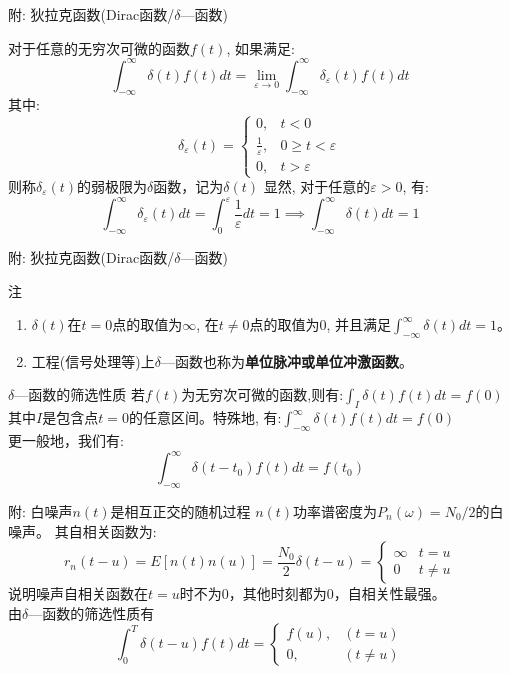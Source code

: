 \begin{frame}{附: 狄拉克函数(Dirac函数/$\delta$---函数)}
\begin{definition}[$\delta$---函数]
	对于任意的无穷次可微的函数$f(t)$, 如果满足:
	$$\int_{-\infty}^{\infty}\delta (t)f(t)dt=\lim\limits_{\varepsilon\to 0}\int_{-\infty}^{\infty}\delta_{\varepsilon}(t)f(t)dt $$
	其中:
	\[
	\delta_{\varepsilon}(t)=\begin{cases}
	0,&t<0\\
	\frac{1}{\varepsilon}, & 0\ge t<\varepsilon\\
	0, &t>\varepsilon
	\end{cases}
	\]
	则称$\delta_\varepsilon(t)$的弱极限为$\delta$函数，记为$\delta(t)$
	显然, 对于任意的$\varepsilon>0$, 有:
	$$\int_{-\infty}^{\infty}\delta_{\varepsilon}(t)dt=\int_{0}^{\varepsilon}\frac{1}{\varepsilon}dt=1\implies \int_{-\infty}^\infty\delta(t)dt=1$$
\end{definition}
\end{frame}

\begin{frame}{附: 狄拉克函数(Dirac函数/$\delta$---函数)}
\begin{block}{注}
\begin{enumerate}
	\item $\delta(t)$在$t=0$点的取值为$\infty$, 在$t\ne 0$点的取值为0, 并且满足$\int_{-\infty}^{\infty}\delta(t)dt=1$。
	\item 工程(信号处理等)上$\delta$---函数也称为\textbf{单位脉冲或单位冲激函数}。
\end{enumerate}
\end{block}
\begin{block}{$\delta$---函数的筛选性质}
若$f(t)$为无穷次可微的函数,则有:$\int_{I}\delta(t)f(t)dt=f(0) $\\
其中$I$是包含点$t=0$的任意区间。特殊地, 有:$\int_{-\infty}^{\infty}\delta(t)f(t)dt=f(0) $\\
更一般地，我们有:
$$\int_{-\infty}^{\infty}\delta(t-t_0)f(t)dt=f(t_0) $$
\end{block}
\end{frame}

\begin{frame}[shrink]{附: 白噪声$n(t)$是相互正交的随机过程}
$n(t)$功率谱密度为$P_n(\omega)=N_0/2$的白噪声。
其自相关函数为: 
\[r_n(t-u)=E[n(t)n(u)]=\frac{N_0}{2}\delta(t-u)=
\begin{cases}
\infty & t=u\\
0 &t\ne u
\end{cases}  
\] 
说明噪声自相关函数在$t=u$时不为0，其他时刻都为0，自相关性最强。\\
由$\delta$---函数的筛选性质有
\[
\int_0^T\delta(t-u)f(t)dt=
\begin{cases}
f(u), & (t=u)\\
0, & (t\ne u) 
\end{cases}
\]
\end{frame}

